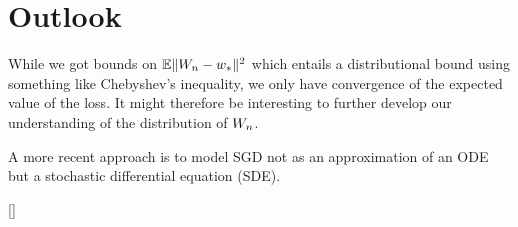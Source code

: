 \section{Outlook}

While we got bounds on \(\mathbb{E}\|W_n - w_*\|^2\) which entails a
distributional bound using something like Chebyshev's inequality, we only
have convergence of the expected value of the loss. It might therefore be
interesting to further develop our understanding of the distribution of \(W_n\).

A more recent approach is to model SGD not as an approximation of an ODE but a
stochastic differential equation (SDE).


[\textcite{simsekliTailIndexAnalysisStochastic2019}]




\endinput
